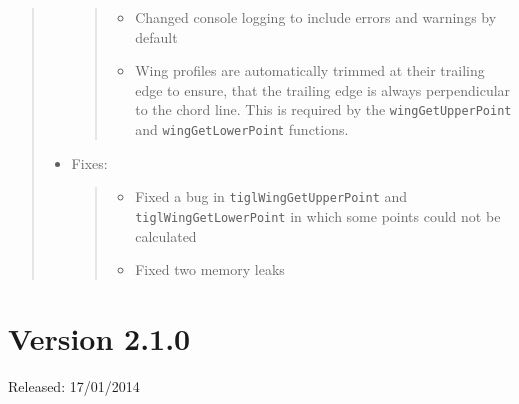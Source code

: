 \documentclass[]{scrartcl}
\begin{document}
\begin{quote}
\begin{itemize}
  \begin{quote}
  \begin{itemize}
  \itemsep1pt\parskip0pt
  \item
    Changed console logging to include errors and warnings by default
  \item
    Wing profiles are automatically trimmed at their trailing edge to
    ensure, that the trailing edge is always perpendicular to the chord
    line. This is required by the \texttt{wingGetUpperPoint} and
    \texttt{wingGetLowerPoint} functions.
  \end{itemize}
  \end{quote}
\item
  Fixes:

  \begin{quote}
  \begin{itemize}
  \itemsep1pt\parskip0pt
  \item
    Fixed a bug in \texttt{tiglWingGetUpperPoint} and
    \texttt{tiglWingGetLowerPoint} in which some points could not be
    calculated
  \item
    Fixed two memory leaks
  \end{itemize}
  \end{quote}
\end{itemize}
\end{quote}

\section{Version 2.1.0}\label{version-2.1.0}

Released: 17/01/2014
\end{document}
